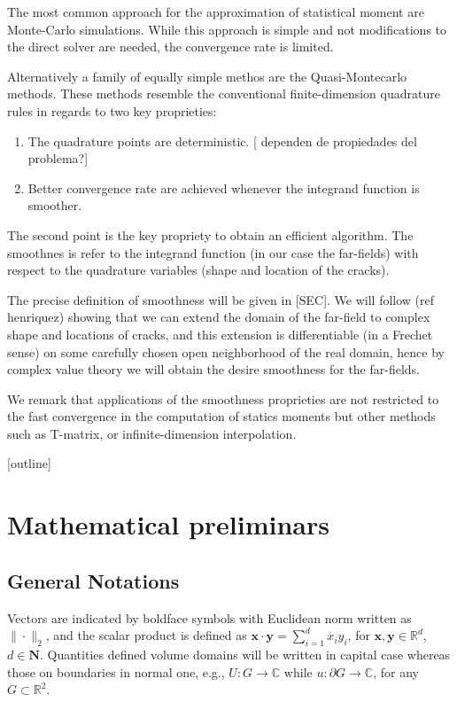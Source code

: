\documentclass{article}
\newcommand{\todo}[1]{{\color{red}[#1]}}
\begin{document}
The most common approach for the approximation of statistical moment are Monte-Carlo simulations. While this approach is simple and not modifications to the direct solver are needed, the convergence rate is limited. 

Alternatively a family of equally simple methos are the Quasi-Montecarlo methods. These methods resemble the conventional finite-dimension quadrature rules in regards to two key proprieties: 
\begin{enumerate} 
\item 
The quadrature points are deterministic. \todo{ dependen de propiedades del problema?}
\item 
Better convergence rate are achieved whenever the integrand function is smoother.  
\end{enumerate}
The second point is the key propriety to obtain an efficient algorithm. The smoothnes is refer to the integrand function (in our case the far-fields) with respect to the quadrature variables (shape and location of the cracks).

The precise definition of smoothness will be given in \todo{SEC}. We will follow (ref henriquez) showing that we can extend the domain of the far-field to complex shape and locations of cracks, and this extension is differentiable (in a Frechet sense) on some carefully chosen open neighborhood of the real domain, hence by complex value theory we will obtain the desire smoothness for the far-fields. 

We remark that applications of the smoothness proprieties are not restricted to the fast convergence in the computation of statics moments but other methods such as T-matrix, or infinite-dimension interpolation. 

\todo{outline}

\section{Mathematical preliminars }
\subsection{General Notations}

Vectors are indicated by boldface symbols with Euclidean norm written as $\| \cdot \|_2$, and the scalar product is defined as $\mathbf{x} \cdot \mathbf{y} = \sum_{i=1}^d x_i y_i$, for $\mathbf{x}, \mathbf{y} \in \mathbb{R}^d$, $d \in \mathbf{N}$. Quantities defined volume domains will be written in capital case whereas those on boundaries
in normal one, e.g., $U : G \rightarrow \mathbb{C}$ while $u:\partial G \rightarrow \mathbb{C}$, for any $G \subset \mathbb{R}^2$.
\end{document}
